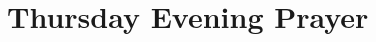 
\null\medskip{%
\parindent 0pt
\noindent
\ifx\preLilyPondExample \undefined
\else
  \expandafter\preLilyPondExample
\fi
\def\lilypondbook{}%

\ifx\postLilyPondExample \undefined
\else
  \expandafter\postLilyPondExample
\fi
}

\newpage

{%
\parindent 0pt
\noindent
\ifx\preLilyPondExample \undefined
\else
  \expandafter\preLilyPondExample
\fi
\def\lilypondbook{}%

\ifx\postLilyPondExample \undefined
\else
  \expandafter\postLilyPondExample
\fi
}


\null\medskip{%
\parindent 0pt
\noindent
\ifx\preLilyPondExample \undefined
\else
  \expandafter\preLilyPondExample
\fi
\def\lilypondbook{}%

\ifx\postLilyPondExample \undefined
\else
  \expandafter\postLilyPondExample
\fi
}

\newpage

{%
\parindent 0pt
\noindent
\ifx\preLilyPondExample \undefined
\else
  \expandafter\preLilyPondExample
\fi
\def\lilypondbook{}%

\ifx\postLilyPondExample \undefined
\else
  \expandafter\postLilyPondExample
\fi
}


\null\medskip{%
\parindent 0pt
\noindent
\ifx\preLilyPondExample \undefined
\else
  \expandafter\preLilyPondExample
\fi
\def\lilypondbook{}%

\ifx\postLilyPondExample \undefined
\else
  \expandafter\postLilyPondExample
\fi
}

\newpage


\section{Thursday Evening Prayer}

{%
\parindent 0pt
\noindent
\ifx\preLilyPondExample \undefined
\else
  \expandafter\preLilyPondExample
\fi
\def\lilypondbook{}%

\ifx\postLilyPondExample \undefined
\else
  \expandafter\postLilyPondExample
\fi
}

